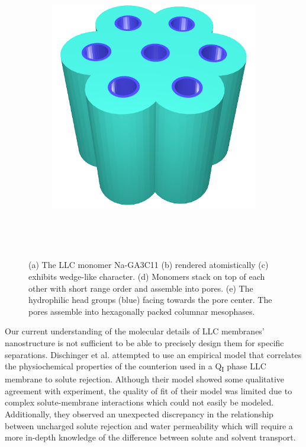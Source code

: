 \documentclass[journal=jpcbfk,manuscript=article]{achemso}
\begin{document}
\begin{figure}
\begin{subfigure}{0.4\linewidth}
		\caption{}~\label{fig:wedge_layer}
	\end{subfigure}
	\begin{subfigure}{0.4\linewidth}
		\centering
		\includegraphics[width=\textwidth]{hexagonal_packing.png}
		\caption{}~\label{fig:hex_packing_simple}
	\end{subfigure}
	\caption{(a) The LLC monomer Na-GA3C11 (b) rendered atomistically (c)
	exhibits wedge-like character. (d) Monomers stack on top of each other with
	short range order and assemble into pores. (e) The hydrophilic head groups 
	(blue) facing towards the pore center. The pores assemble into hexagonally
	packed columnar mesophases.}~\label{fig:assembly}
  \end{figure}

  Our current understanding of the molecular details of LLC membranes'
  nanostructure is not sufficient to be able to precisely design them for
  specific separations. Dischinger et al. attempted to use an empirical model
  that correlates the physiochemical properties of the counterion used in a 
  Q\textsubscript{I} phase LLC membrane to solute rejection\cite{dischinger_effect_2017}.
  Although their model showed some qualitative agreement with experiment, the
  quality of fit of their model was limited due to complex solute-membrane 
  interactions which could not easily be modeled. Additionally, they observed
  an unexpected discrepancy in the relationship between uncharged solute
  rejection and water permeability which will require a more in-depth knowledge of
  the difference between solute and solvent transport.
  
\end{document}
